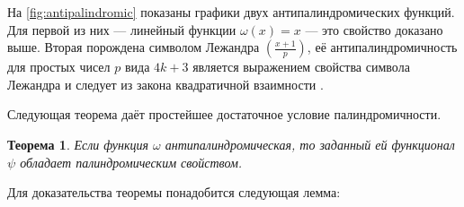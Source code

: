 \documentclass[14pt, a4paper, russian]{report}
\newtheorem{theorem}{\indent Теорема}
\begin{document}
На \cref{fig:antipalindromic} показаны графики двух антипалиндромических функций. Для первой из них --- линейный функции $\omega(x)=x$ --- это свойство доказано выше. Вторая порождена символом Лежандра $(\frac{x+1}{p})$, её антипалиндромичность для простых чисел $p$ вида $4k+3$ является выражением свойства символа Лежандра и следует из закона квадратичной взаимности \cite{vinogradov}.

Следующая теорема даёт простейшее достаточное условие палиндромичности.

\begin{theorem}\label{palindromic_theorem}
Если функция $\omega$ антипалиндромическая, то заданный ей функционал $\psi$ обладает палиндромическим свойством.
\end{theorem}

Для доказательства теоремы понадобится следующая лемма:
\end{document}
